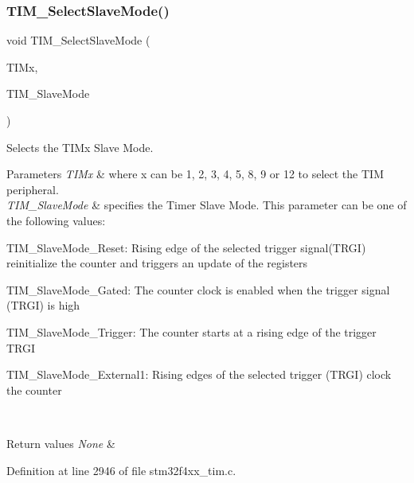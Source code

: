 \subsubsection{\texorpdfstring{T\+I\+M\+\_\+\+Select\+Slave\+Mode()}{TIM\_SelectSlaveMode()}}
{\footnotesize\ttfamily void T\+I\+M\+\_\+\+Select\+Slave\+Mode (\begin{DoxyParamCaption}\item[{\hyperlink{struct_t_i_m___type_def}{T\+I\+M\+\_\+\+Type\+Def} $\ast$}]{T\+I\+Mx,  }\item[{uint16\+\_\+t}]{T\+I\+M\+\_\+\+Slave\+Mode }\end{DoxyParamCaption})}



Selects the T\+I\+Mx Slave Mode. 


\begin{DoxyParams}{Parameters}
{\em T\+I\+Mx} & where x can be 1, 2, 3, 4, 5, 8, 9 or 12 to select the T\+IM peripheral. \\
\hline
{\em T\+I\+M\+\_\+\+Slave\+Mode} & specifies the Timer Slave Mode. This parameter can be one of the following values\+: \begin{DoxyItemize}
\item T\+I\+M\+\_\+\+Slave\+Mode\+\_\+\+Reset\+: Rising edge of the selected trigger signal(\+T\+R\+G\+I) reinitialize the counter and triggers an update of the registers \item T\+I\+M\+\_\+\+Slave\+Mode\+\_\+\+Gated\+: The counter clock is enabled when the trigger signal (T\+R\+GI) is high \item T\+I\+M\+\_\+\+Slave\+Mode\+\_\+\+Trigger\+: The counter starts at a rising edge of the trigger T\+R\+GI \item T\+I\+M\+\_\+\+Slave\+Mode\+\_\+\+External1\+: Rising edges of the selected trigger (T\+R\+GI) clock the counter \end{DoxyItemize}
\\
\hline
\end{DoxyParams}

\begin{DoxyRetVals}{Return values}
{\em None} & \\
\hline
\end{DoxyRetVals}


Definition at line 2946 of file stm32f4xx\+\_\+tim.\+c.

